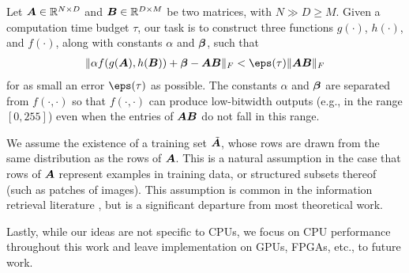 Let $\bm{A} \in \mathbb{R}^{N \times D}$ and $\bm{B} \in \mathbb{R}^{D \times M}$ be two matrices, with $N \gg D \ge M$. Given a computation time budget $\tau$, our task is to
construct three functions $g(\cdot)$, $h(\cdot)$, and $f(\cdot)$, along with constants $\alpha$ and $\bm{\beta}$, such that
\begin{align} \label{eq:objective}
    \norm{\alpha f(g(\A), h(\B)) + \mat{\beta} - \A\B}_F < \eps(\tau) \norm{\A\B}_F
\end{align}
for as small an error $\eps(\tau)$ as possible. The constants $\alpha$ and $\bm{\beta}$ are separated from $f(\cdot,\cdot)$ so that $f(\cdot,\cdot)$ can produce low-bitwidth outputs (e.g., in the range $[0, 255]$) even when the entries of $\bm{A}\bm{B}$ do not fall in this range.

We assume the existence of a training set $\tilde{\bm{A}}$, whose rows are drawn from the same distribution as the rows of $\bm{A}$. This is a natural assumption in the case that rows of $\bm{A}$ represent examples in training data, or structured subsets thereof (such as patches of images). This assumption is common in the information retrieval literature \cite{bolt,pairq,quip}, but is a significant departure from most theoretical work.

\vspace{-.5mm}
Lastly, while our ideas are not specific to CPUs, we focus on CPU performance throughout this work and leave implementation on GPUs, FPGAs, etc., to future work.
